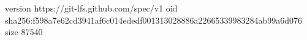 version https://git-lfs.github.com/spec/v1
oid sha256:f598a7e62cd3941af6c014ededf001313028886a22665339983284ab99a6d076
size 87540
